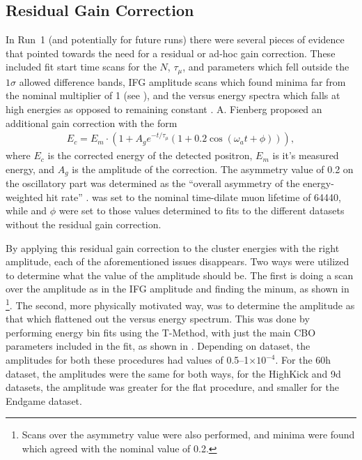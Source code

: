 \subsection{Residual Gain Correction}
\label{sub:residual_gain_correction}


In Run~1 (and potentially for future runs) there were several pieces of evidence that pointed towards the need for a residual or ad-hoc gain correction. These included fit start time scans for the $N$, $\tau_{\mu}$, and \K parameters which fell outside the $1\sigma$ allowed difference bands, IFG amplitude scans which found minima far from the nominal multiplier of 1 (see ), and the \K versus energy spectra which falls at high energies as opposed to remaining constant \cite{phdthesis:2019Fienberg,phdthesis:2020Sweigart,AdHoc1,AdHoc2}. A. Fienberg proposed an additional gain correction with the form
\begin{align}
  E_{c} = E_{m} \cdot (1 + A_{g} e^{-t/\tau_{\mu}} (1 + 0.2 \cos(\omega_{a}t + \phi))),
\end{align}
where $E_{c}$ is the corrected energy of the detected positron, $E_{m}$ is it's measured energy, and $A_{g}$ is the amplitude of the correction. The asymmetry value of 0.2 on the oscillatory part was determined as the ``overall asymmetry of the energy-weighted hit rate'' \cite{phdthesis:2019Fienberg}. \taumu was set to the nominal time-dilate muon lifetime of \SI{64440}{\mus{}}, while \wa and $\phi$ were set to those values determined to fits to the different datasets without the residual gain correction.


By applying this residual gain correction to the cluster energies with the right amplitude, each of the aforementioned issues disappears. Two ways were utilized to determine what the value of the amplitude should be. The first is doing a scan over the amplitude as in the IFG amplitude and finding the minum, as shown in \footnote{Scans over the asymmetry value were also performed, and minima were found which agreed with the nominal value of 0.2.}. The second, more physically motivated way, was to determine the amplitude as that which flattened out the \K versus energy spectrum. This was done by performing energy bin fits using the T-Method, with just the main CBO parameters included in the fit, as shown in . Depending on dataset, the amplitudes for both these procedures had values of 0.5--1$\times 10^{-4}$. For the 60h dataset, the amplitudes were the same for both ways, for the HighKick and 9d datasets, the amplitude was greater for the flat \K procedure, and smaller for the Endgame dataset.



